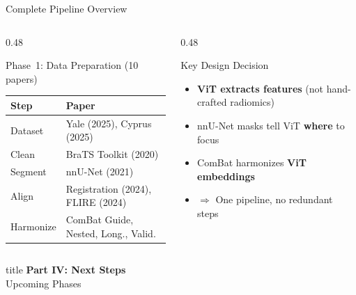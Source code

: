 \documentclass[aspectratio=169,xcolor=dvipsnames]{beamer}
\begin{document}
\begin{frame}{Complete Pipeline Overview}
    \begin{columns}
        \begin{column}{0.48\textwidth}
            \begin{block}{\small Phase~1: Data Preparation (10 papers)}
                \scriptsize
                \begin{tabular}{ll}
                    \textbf{Step} & \textbf{Paper} \\
                    \midrule
                    Dataset & Yale (2025), Cyprus (2025) \\
                    Clean & BraTS Toolkit (2020) \\
                    Segment & nnU-Net (2021) \\
                    Align & Registration (2024), FLIRE (2024) \\
                    Harmonize & ComBat Guide, Nested, Long., Valid. \\
                \end{tabular}
            \end{block}
        \end{column}

        \begin{column}{0.48\textwidth}
            \begin{block}{\small Key Design Decision}
                \scriptsize
                \begin{itemize}
                    \item \textbf{ViT extracts features} (not hand-crafted radiomics)
                    \item nnU-Net masks tell ViT \textbf{where} to focus
                    \item ComBat harmonizes \textbf{ViT embeddings}
                    \item $\Rightarrow$ One pipeline, no redundant steps
                \end{itemize}
            \end{block}
        \end{column}
    \end{columns}
\end{frame}

\begin{frame}[plain]
    \centering
    \vfill
    \begin{beamercolorbox}[center,shadow=true,rounded=true]{title}
        \textbf{Part IV: Next Steps}\\
        \vspace{0.5em}
        \large Upcoming Phases
    \end{beamercolorbox}
    \vfill
\end{frame}
\end{document}

